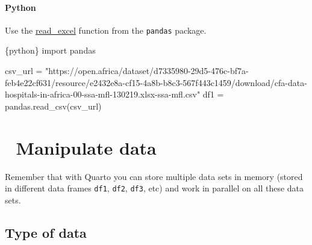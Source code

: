 \documentclass[
  letterpaper,
  DIV=11,
  numbers=noendperiod]{scrreprt}
\newenvironment{Shaded}{\begin{snugshade}}{\end{snugshade}}
\newcommand{\ImportTok}[1]{\textcolor[rgb]{0.00,0.46,0.62}{#1}}
\newcommand{\InformationTok}[1]{\textcolor[rgb]{0.37,0.37,0.37}{#1}}
\newcommand{\NormalTok}[1]{\textcolor[rgb]{0.00,0.23,0.31}{#1}}
\newcommand{\OperatorTok}[1]{\textcolor[rgb]{0.37,0.37,0.37}{#1}}
\newcommand{\StringTok}[1]{\textcolor[rgb]{0.13,0.47,0.30}{#1}}
\begin{document}
\hypertarget{python-3}{%
\subsubsection{Python}\label{python-3}}

Use the
\href{https://pandas.pydata.org/docs/reference/api/pandas.read_excel.html}{read\_excel}
function from the \texttt{pandas} package.

\begin{Shaded}
\begin{Highlighting}[]
\InformationTok{\textasciigrave{}\textasciigrave{}\textasciigrave{}\{python\}}
\ImportTok{import}\NormalTok{ pandas}

\NormalTok{csv\_url }\OperatorTok{=} \StringTok{"https://open.africa/dataset/d7335980{-}29d5{-}476c{-}bf7a{-}feb4e22cf631/resource/e2432e8a{-}cf15{-}4a8b{-}b8c3{-}567f443c1459/download/cfa{-}data{-}hospitals{-}in{-}africa{-}00{-}ssa{-}mfl{-}130219.xlsx{-}ssa{-}mfl.csv"}
\NormalTok{df1 }\OperatorTok{=}\NormalTok{ pandas.read\_csv(csv\_url)}
\InformationTok{\textasciigrave{}\textasciigrave{}\textasciigrave{}}
\end{Highlighting}
\end{Shaded}

\hypertarget{manipulate-data}{%
\chapter{\texorpdfstring{{📘} Manipulate
data}{📘 Manipulate data}}\label{manipulate-data}}

\begin{tcolorbox}[enhanced jigsaw, colframe=quarto-callout-important-color-frame, colback=white, rightrule=.15mm, bottomrule=.15mm, left=2mm, arc=.35mm, coltitle=black, title=\textcolor{quarto-callout-important-color}{\faExclamation}\hspace{0.5em}{Important}, opacitybacktitle=0.6, bottomtitle=1mm, opacityback=0, toptitle=1mm, toprule=.15mm, colbacktitle=quarto-callout-important-color!10!white, titlerule=0mm, leftrule=.75mm, breakable]
Remember that with Quarto you can store multiple data sets in memory
(stored in different data frames \texttt{df1}, \texttt{df2},
\texttt{df3}, etc) and work in parallel on all these data sets.
\end{tcolorbox}

\hypertarget{type-of-data}{%
\section{Type of data}\label{type-of-data}}
\end{document}
